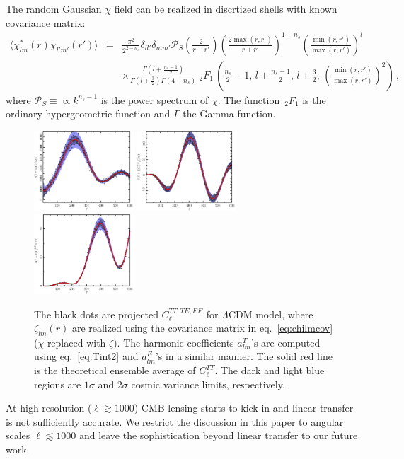 The random Gaussian $\chi$ field can be realized in discrtized shells with known covariance matrix:
\begin{eqnarray}
  \langle \chi^*_{lm}(r) \chi_{l'm'}(r')\rangle &=& \frac{\pi^2}{2^{2-n_s}}  \delta_{ll'}\delta_{mm'} \mathcal{P}_S\left(\frac{2}{r+r'}\right) \left(\frac{2\max(r,r')}{r+r'}\right)^{1-n_s} \left(\frac{\min(r, r')}{\max(r,r')}\right)^l \label{eq:chilmcov} \\
 &&  \times \frac{\Gamma\left(l+\frac{n_s-1}{2}\right)}{\Gamma\left(l+\frac{3}{2}\right)\Gamma\left(4-n_s\right)} {\ _2F_1\,}\left( \frac{n_s}{2}-1,\, l+\frac{n_s-1}{2},\, l+ \frac{3}{2},\, \left(\frac{\min(r, r')}{\max(r,r')}\right)^2\right)     \nonumber \, , 
\end{eqnarray}
where $\mathcal{P}_S\equiv \propto k^{n_s-1} $ is the power spectrum of $\chi$. The function $\,_2F_1$ is the ordinary hypergeometric function and $\Gamma$ the Gamma function.

\begin{figure}
  \includegraphics[width=0.33\textwidth]{ClTT_proj.pdf}%
  \includegraphics[width=0.33\textwidth]{ClTE_proj.pdf}%
  \includegraphics[width=0.33\textwidth]{ClEE_proj.pdf}
  \caption{The black dots are projected $C_\ell^{TT,TE,EE}$ for $\Lambda$CDM model, where $\zeta_{lm}(r)$ are realized using the covariance matrix in eq.~\eqref{eq:chilmcov} ($\chi$ replaced with $\zeta$). The harmonic coefficients $a_{lm}^T$'s are computed using eq.~\eqref{eq:Tint2} and $a_{lm}^E$'s in a similar manner. The solid red line is the theoretical ensemble average of $C_\ell^{TT}$. The dark and light blue regions are $1\sigma$ and $2\sigma$ cosmic variance limits, respectively. }
\end{figure} 


At high resolution ($\ell \gtrsim 1000$) CMB lensing starts to kick in and linear transfer is not sufficiently accurate. We restrict the discussion in this paper to angular scales $\ell \lesssim 1000$ and leave the sophistication beyond linear transfer to our future work.


